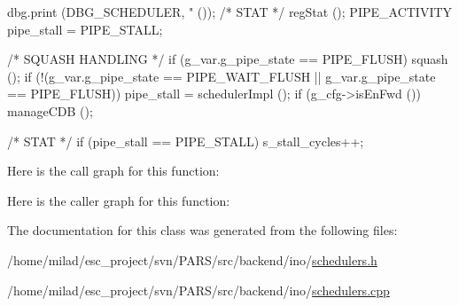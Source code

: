 \begin{DoxyCode}
                             {
    dbg.print (DBG_SCHEDULER, "%
      ());
    /* STAT */
    regStat ();
    PIPE_ACTIVITY pipe_stall = PIPE_STALL;

    /* SQUASH HANDLING */
    if (g_var.g_pipe_state == PIPE_FLUSH) { squash (); }
    if (!(g_var.g_pipe_state == PIPE_WAIT_FLUSH || g_var.g_pipe_state == 
      PIPE_FLUSH)) {
        pipe_stall = schedulerImpl ();
    }
    if (g_cfg->isEnFwd ()) manageCDB ();

    /* STAT */
    if (pipe_stall == PIPE_STALL) s_stall_cycles++;
}
\end{DoxyCode}


Here is the call graph for this function:




Here is the caller graph for this function:




The documentation for this class was generated from the following files:\begin{DoxyCompactItemize}
\item 
/home/milad/esc\_\-project/svn/PARS/src/backend/ino/\hyperlink{ino_2schedulers_8h}{schedulers.h}\item 
/home/milad/esc\_\-project/svn/PARS/src/backend/ino/\hyperlink{ino_2schedulers_8cpp}{schedulers.cpp}\end{DoxyCompactItemize}
